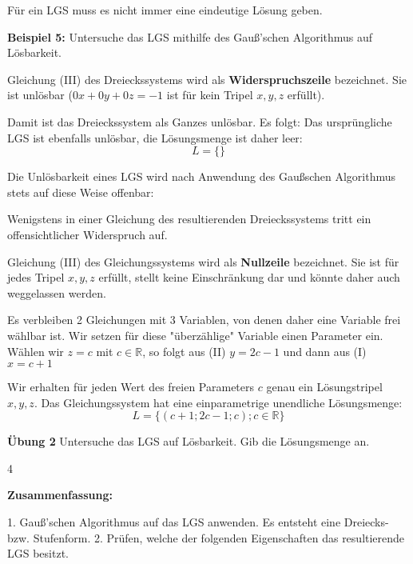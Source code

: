 \documentclass{article}
\begin{document}
Für ein LGS muss es nicht immer eine eindeutige Lösung geben.

\textbf{Beispiel 5:} Untersuche das LGS mithilfe des Gauß'schen Algorithmus auf Lösbarkeit.

\begin{minipage}[t]{0.48\textwidth}
Gleichung (III) des Dreieckssystems wird als \textbf{Widerspruchszeile} bezeichnet. Sie ist unlösbar ($0x + 0y + 0z = -1$ ist für kein Tripel $x, y, z$ erfüllt).

Damit ist das Dreieckssystem als Ganzes unlösbar.
Es folgt: Das ursprüngliche LGS ist ebenfalls unlösbar, die Lösungsmenge ist daher leer:
$$L = \{\}$$

Die Unlösbarkeit eines LGS wird nach Anwendung des Gaußschen Algorithmus stets auf diese Weise offenbar:

Wenigstens in einer Gleichung des resultierenden Dreieckssystems tritt ein offensichtlicher Widerspruch auf.
\end{minipage}%
\hfill%
\begin{minipage}[t]{0.48\textwidth}
Gleichung (III) des Gleichungssystems wird als \textbf{Nullzeile} bezeichnet. Sie ist für jedes Tripel $x, y, z$ erfüllt, stellt keine Einschränkung dar und könnte daher auch weggelassen werden.

Es verbleiben 2 Gleichungen mit 3 Variablen, von denen daher eine Variable frei wählbar ist. Wir setzen für diese "überzählige" Variable einen Parameter ein.
Wählen wir $z = c$ \hfill mit $c \in \mathbb{R}$,
so folgt aus (II) $y = 2c - 1$
und dann aus (I) $x = c + 1$

Wir erhalten für jeden Wert des freien Parameters $c$ genau ein Lösungstripel $x, y, z$. Das Gleichungssystem hat eine einparametrige unendliche Lösungsmenge:
$$L = \{(c + 1; 2c - 1; c); c \in \mathbb{R}\}$$
\end{minipage}

\textbf{Übung 2} Untersuche das LGS auf Lösbarkeit. Gib die Lösungsmenge an.

\hfill 4

\newpage

\textbf{Zusammenfassung:}

1. Gauß'schen Algorithmus auf das LGS anwenden.
Es entsteht eine Dreiecks- bzw. Stufenform.
2. Prüfen, welche der folgenden Eigenschaften das resultierende LGS besitzt.
\end{document}
